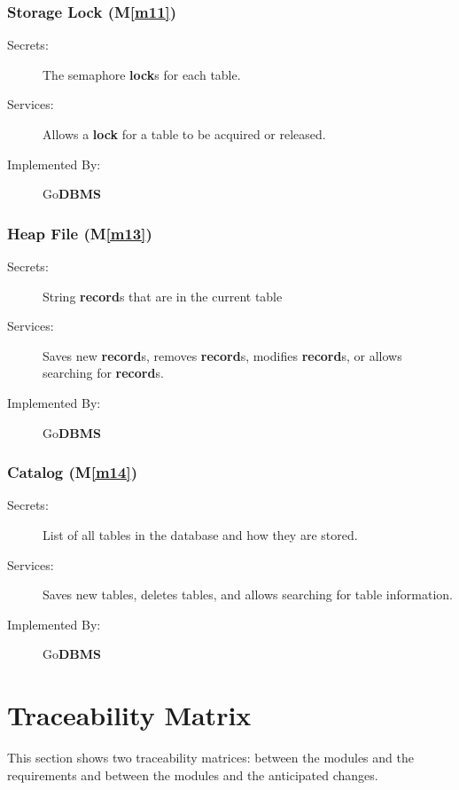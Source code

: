 \documentclass[12pt, titlepage]{article}
\newcommand{\mref}[1]{M\ref{#1}}
\begin{document}
\subsubsection{Storage Lock (\mref{m11})}
\begin{description}
\item[Secrets:]The semaphore \textbf{lock}s for each table.
\item[Services:]Allows a \textbf{lock} for a table to be acquired or released.
\item[Implemented By:] Go\textbf{DBMS}
\end{description}

\subsubsection{Heap File (\mref{m13})}
\begin{description}
\item[Secrets:]String \textbf{record}s that are in the current table
\item[Services:]Saves new \textbf{record}s, removes \textbf{record}s, modifies \textbf{record}s, or allows searching for \textbf{record}s.
\item[Implemented By:] Go\textbf{DBMS}
\end{description}

\subsubsection{\textbf{Catalog} (\mref{m14})}
\begin{description}
\item[Secrets:]List of all tables in the database and how they are stored.
\item[Services:]Saves new tables, deletes tables, and allows searching for table information.
\item[Implemented By:] Go\textbf{DBMS}
\end{description}

\section{Traceability Matrix} \label{SecTM}

This section shows two traceability matrices: between the modules and the
requirements and between the modules and the anticipated changes.
\end{document}
